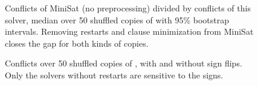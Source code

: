 \begin{figure}[ht]
\centering
{}
\caption{Conflicts of MiniSat (no preprocessing) divided by conflicts of this
solver, median over 50 shuffled copies of  with 95\% bootstrap
intervals. Removing restarts and clause minimization from MiniSat closes the
gap for both kinds of copies.}
\label{fig:ablation}
\end{figure}

\begin{figure}[ht]
\centering
{}
\caption{Conflicts over 50 shuffled copies of , with and without
sign flips. Only the solvers without restarts are sensitive to the signs.}
\label{fig:luck}
\end{figure}

